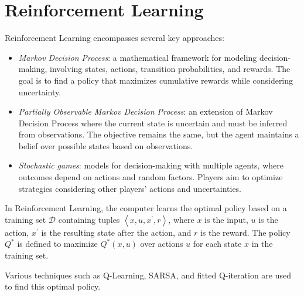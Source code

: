 \section{Reinforcement Learning}

Reinforcement Learning encompasses several key approaches:
\begin{itemize}
    \item \textit{Markov Decision Process}: a mathematical framework for modeling decision-making, involving states, actions, transition probabilities, and rewards. 
        The goal is to find a policy that maximizes cumulative rewards while considering uncertainty.
    \item \textit{Partially Observable Markov Decision Process}: an extension of Markov Decision Process where the current state is uncertain and must be inferred from observations. 
        The objective remains the same, but the agent maintains a belief over possible states based on observations.
    \item \textit{Stochastic games}: models for decision-making with multiple agents, where outcomes depend on actions and random factors. 
        Players aim to optimize strategies considering other players' actions and uncertainties.
\end{itemize}
In Reinforcement Learning, the computer learns the optimal policy based on a training set $\mathcal{D}$ containing tuples $\left\langle x,u,x^\prime,r \right\rangle$, where $x$ is the input, $u$ is the action, $x^\prime$ is the resulting state after the action, and $r$ is the reward.
The policy $Q^\ast$ is defined to maximize $Q^\ast(x,u)$ over actions $u$ for each state $x$ in the training set. 

Various techniques such as Q-Learning, SARSA, and fitted Q-iteration are used to find this optimal policy.
